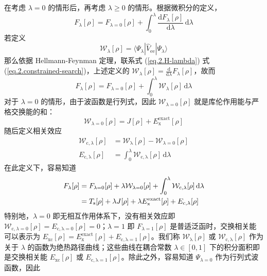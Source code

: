 在考虑 $\lambda=0$ 的情形后，再考虑 $\lambda \geqslant 0$ 的情形。根据微积分的定义，
\begin{equation}
  F_\lambda [\rho] = F_{\lambda=0} [\rho] + \int_0^\lambda \frac{\mathrm{d} F_{\lambda} [\rho]}{\mathrm{d} \lambda} \, \mathrm{d} \lambda
\end{equation}
若定义
\begin{equation}
  \mathcal{W}_\lambda [\rho] = \langle \Psi_\lambda | \hat V_\mathrm{ee} | \Psi_\lambda \rangle
\end{equation}
那么依据 Hellmann-Feynman 定理，联系式 (\ref{eq.2.H-lambda}) 式 (\ref{eq.2.constrained-search})，上述定义的 $\mathcal{W}_\lambda [\rho] = \frac{\mathrm{d}}{\mathrm{d} \lambda} F_\lambda [\rho]$，故而
\begin{equation}
  F_\lambda [\rho] = F_{\lambda=0} [\rho] + \int_0^\lambda \mathcal{W}_{\lambda} [\rho] \, \mathrm{d} \lambda
\end{equation}
对于 $\lambda=0$ 的情形，由于波函数是行列式，因此 $\mathcal{W}_{\lambda=0} [\rho]$ 就是库伦作用能与严格交换能的和：
\begin{equation}
  \mathcal{W}_{\lambda=0} [\rho] = J[\rho] + E_\mathrm{x}^\mathrm{exact} [\rho]
\end{equation}
随后定义相关效应
\begin{align}
  \mathcal{W}_{\mathrm{c}, \lambda} [\rho] &= \mathcal{W}_\mathrm{\lambda} [\rho] - \mathcal{W}_{\lambda=0} [\rho] \\
  \label{eq.2.E-c-lambda}
  E_\mathrm{c, \lambda} [\rho] &= \int_0^\lambda \mathcal{W}_\mathrm{c, \lambda} [\rho] \, \mathrm{d} \lambda
\end{align}
在此定义下，容易知道
\begin{align}
  \label{eq.2.F-with-lambda}
  F_\lambda [\rho] &= F_{\lambda=0} [\rho] + \lambda \mathcal{W}_{\lambda=0} [\rho] + \int_0^\lambda \mathcal{W}_\mathrm{c, \lambda} [\rho] \, \mathrm{d} \lambda \notag\\
  &= T_\mathrm{s} [\rho] + \lambda J[\rho] + \lambda E_\mathrm{x}^\mathrm{exact} [\rho] + E_\mathrm{c, \lambda} [\rho]
\end{align}
特别地，$\lambda = 0$ 即无相互作用体系下，没有相关效应即 $\mathcal{W}_{\mathrm{c}, \lambda=0} [\rho] = E_\mathrm{c, \lambda=0} [\rho] = 0$；$\lambda = 1$ 即 $F_{\lambda=1} [\rho]$ 是普适泛函时，交换相关能可以表示为 $E_\mathrm{xc} [\rho] = E_\mathrm{x}^\mathrm{exact} [\rho] + E_\mathrm{c, \lambda=1} [\rho]$。我们称 $\mathcal{W}_\mathrm{\lambda}[\rho]$ 或 $\mathcal{W}_\mathrm{c, \lambda}[\rho]$ 作为关于 $\lambda$ 的函数为绝热路径曲线；这些曲线在耦合常数 $\lambda \in [0, 1]$ 下的积分面积即是交换相关能 $E_\mathrm{xc}[\rho]$ 或 $E_\mathrm{c, \lambda=1}[\rho]$。除此之外，容易知道 $\Psi_{\lambda=0}$ 作为行列式波函数，因此

